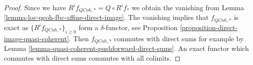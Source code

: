 \documentclass[10pt,a4paper]{amsart}
\theoremstyle{plain}
\theoremstyle{definition}
\theoremstyle{remark}
\numberwithin{equation}{subsection}
\def\QCoh{\mathit{QCoh}}
\begin{document}
\begin{proof}
Since we have $R^if_{\QCoh, *} = Q \circ R^if_*$ we obtain the
vanishing from Lemma \ref{lemma-loc-qcoh-fbc-affine-direct-image}.
The vanishing implies that $f_{\QCoh, *}$ is exact as
$\{R^if_{\QCoh, *}\}_{i \geq 0}$ form a $\delta$-functor, see
Proposition \ref{proposition-direct-image-quasi-coherent}.
Then $f_{\QCoh, *}$ commutes with direct sums for example by
Lemma \ref{lemma-quasi-coherent-pushforward-direct-sums}.
An exact functor which commutes with direct sums commutes
with all colimits.
\end{proof}
\end{document}

